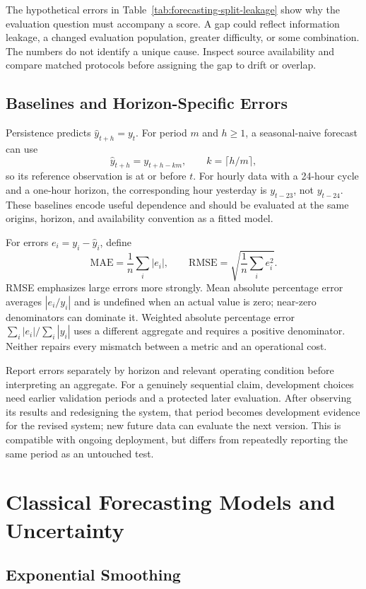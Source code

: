 The hypothetical errors in Table~\ref{tab:forecasting-split-leakage} show why the evaluation question must accompany a score. A gap could reflect information leakage, a changed evaluation population, greater difficulty, or some combination. The numbers do not identify a unique cause. Inspect source availability and compare matched protocols before assigning the gap to drift or overlap.

\subsection{Baselines and Horizon-Specific Errors}

Persistence predicts $\hat y_{t+h}=y_t$. For period $m$ and $h\ge1$, a seasonal-naive forecast can use
\[
 \hat y_{t+h}=y_{t+h-km},\qquad k=\lceil h/m\rceil,
\]
so its reference observation is at or before $t$. For hourly data with a 24-hour cycle and a one-hour horizon, the corresponding hour yesterday is $y_{t-23}$, not $y_{t-24}$. These baselines encode useful dependence and should be evaluated at the same origins, horizon, and availability convention as a fitted model.

For errors $e_i=y_i-\hat y_i$, define
\[
 \mathrm{MAE}=\frac1n\sum_i|e_i|,\qquad
 \mathrm{RMSE}=\sqrt{\frac1n\sum_ie_i^2}.
\]
RMSE emphasizes large errors more strongly. Mean absolute percentage error averages $|e_i/y_i|$ and is undefined when an actual value is zero; near-zero denominators can dominate it. Weighted absolute percentage error $\sum_i|e_i|/\sum_i|y_i|$ uses a different aggregate and requires a positive denominator. Neither repairs every mismatch between a metric and an operational cost.

Report errors separately by horizon and relevant operating condition before interpreting an aggregate. For a genuinely sequential claim, development choices need earlier validation periods and a protected later evaluation. After observing its results and redesigning the system, that period becomes development evidence for the revised system; new future data can evaluate the next version. This is compatible with ongoing deployment, but differs from repeatedly reporting the same period as an untouched test.

\section{Classical Forecasting Models and Uncertainty}
\label{sec:classical-forecasting}

\subsection{Exponential Smoothing}

